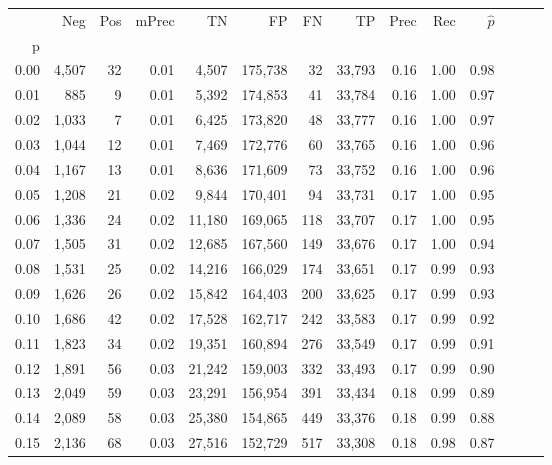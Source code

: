 \begin{tabular}{rrrrrrrrrrrrrr}
\toprule
{} &    Neg &    Pos & mPrec &       TN &       FP &      FN &      TP &  Prec &   Rec & $\hat{p}$ \\
p    &        &        &       &          &          &         &         &       &       &           \\
\midrule
0.00 &  4,507 &     32 &  0.01 &    4,507 &  175,738 &      32 &  33,793 &  0.16 &  1.00 &      0.98 \\
0.01 &    885 &      9 &  0.01 &    5,392 &  174,853 &      41 &  33,784 &  0.16 &  1.00 &      0.97 \\
0.02 &  1,033 &      7 &  0.01 &    6,425 &  173,820 &      48 &  33,777 &  0.16 &  1.00 &      0.97 \\
0.03 &  1,044 &     12 &  0.01 &    7,469 &  172,776 &      60 &  33,765 &  0.16 &  1.00 &      0.96 \\
0.04 &  1,167 &     13 &  0.01 &    8,636 &  171,609 &      73 &  33,752 &  0.16 &  1.00 &      0.96 \\
0.05 &  1,208 &     21 &  0.02 &    9,844 &  170,401 &      94 &  33,731 &  0.17 &  1.00 &      0.95 \\
0.06 &  1,336 &     24 &  0.02 &   11,180 &  169,065 &     118 &  33,707 &  0.17 &  1.00 &      0.95 \\
0.07 &  1,505 &     31 &  0.02 &   12,685 &  167,560 &     149 &  33,676 &  0.17 &  1.00 &      0.94 \\
0.08 &  1,531 &     25 &  0.02 &   14,216 &  166,029 &     174 &  33,651 &  0.17 &  0.99 &      0.93 \\
0.09 &  1,626 &     26 &  0.02 &   15,842 &  164,403 &     200 &  33,625 &  0.17 &  0.99 &      0.93 \\
0.10 &  1,686 &     42 &  0.02 &   17,528 &  162,717 &     242 &  33,583 &  0.17 &  0.99 &      0.92 \\
0.11 &  1,823 &     34 &  0.02 &   19,351 &  160,894 &     276 &  33,549 &  0.17 &  0.99 &      0.91 \\
0.12 &  1,891 &     56 &  0.03 &   21,242 &  159,003 &     332 &  33,493 &  0.17 &  0.99 &      0.90 \\
0.13 &  2,049 &     59 &  0.03 &   23,291 &  156,954 &     391 &  33,434 &  0.18 &  0.99 &      0.89 \\
0.14 &  2,089 &     58 &  0.03 &   25,380 &  154,865 &     449 &  33,376 &  0.18 &  0.99 &      0.88 \\
0.15 &  2,136 &     68 &  0.03 &   27,516 &  152,729 &     517 &  33,308 &  0.18 &  0.98 &      0.87 \\

\end{tabular}
